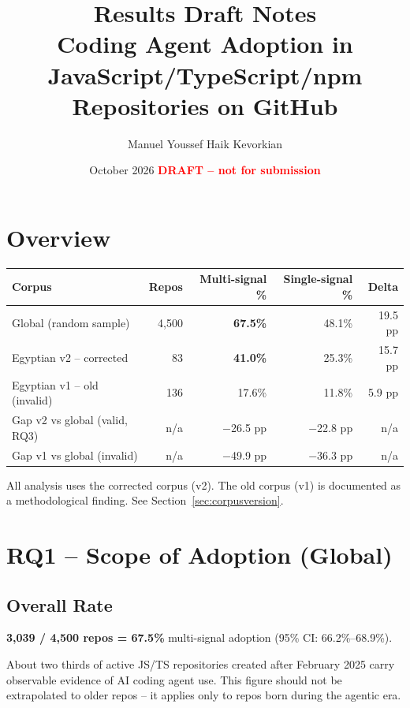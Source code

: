 \documentclass[12pt,a4paper]{article}
\title{\textbf{Results Draft Notes}\\
\large Coding Agent Adoption in JavaScript/TypeScript/npm Repositories on GitHub}
\author{Manuel Youssef Haik Kevorkian}
\date{October 2026 \quad\textcolor{red}{\textbf{DRAFT -- not for submission}}}
\begin{document}
\maketitle
\tableofcontents
\newpage

\section{Overview}

\begin{table}[h]
\centering
\begin{tabular}{@{}lrrrr@{}}
\toprule
Corpus & Repos & Multi-signal \% & Single-signal \% & Delta \\
\midrule
Global (random sample)               & 4,500 & \textbf{67.5\%} & 48.1\% & 19.5 pp \\
Egyptian v2 -- corrected             &    83 & \textbf{41.0\%} & 25.3\% & 15.7 pp \\
Egyptian v1 -- old (invalid)         &   136 & 17.6\%          & 11.8\% &  5.9 pp \\
\midrule
Gap v2 vs global (valid, RQ3)        & n/a & $-$26.5 pp      & $-$22.8 pp & n/a \\
Gap v1 vs global (invalid)           & n/a & $-$49.9 pp      & $-$36.3 pp & n/a \\
\bottomrule
\end{tabular}
\end{table}

All analysis uses the corrected corpus (v2). The old corpus (v1) is documented as a methodological finding. See Section~\ref{sec:corpusversion}.

\section{RQ1 -- Scope of Adoption (Global)}

\subsection{Overall Rate}

\textbf{3,039 / 4,500 repos = 67.5\%} multi-signal adoption (95\% CI: 66.2\%--68.9\%).

About two thirds of active JS/TS repositories created after February 2025 carry observable evidence of AI coding agent use. This figure should not be extrapolated to older repos -- it applies only to repos born during the agentic era.
\end{document}
